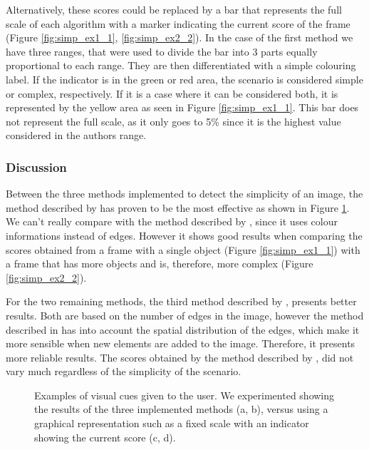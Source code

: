 Alternatively, these scores could be replaced by a bar that represents the full scale of each algorithm with a marker indicating the current score of the frame (Figure \ref{fig:simp_ex1_1}, \ref{fig:simp_ex2_2}).
In the case of the first method \cite{luo2008photo} we have three ranges, that were used to divide the bar into 3 parts equally proportional to each range. They are then differentiated with a simple colouring label. If the indicator is in the green or red area, the scenario is considered simple or complex, respectively. If it is a case where it can be considered both, it is represented by the yellow area as seen in Figure \ref{fig:simp_ex1_1}. This bar does not represent the full scale, as it only goes to 5\% since it is the highest value considered in the authors range.

\subsubsection{Discussion}
\label{subsub:simp_disc}

Between the three methods implemented to detect the simplicity of an image, the method described by \citeauthor{ke2006design} \cite{ke2006design} has proven to be the most effective as shown in Figure \ref{fig:simp_ex}. We can't really compare with the method described by \citeauthor{luo2008photo} \cite{luo2008photo}, since it uses colour informations instead of edges. However it shows good results when comparing the scores obtained from a frame with a single object (Figure \ref{fig:simp_ex1_1}) with a frame that has more objects and is, therefore, more complex (Figure \ref{fig:simp_ex2_2}).

For the two remaining methods, the third method described by \citeauthor{ke2006design} \cite{ke2006design}, presents better results. Both are based on the number of edges in the image, however the method described in \cite{ke2006design} has into account the spatial distribution of the edges, which make it more sensible when new elements are added to the image. Therefore, it presents more reliable results. The scores obtained by the method described by \citeauthor{kaoautomatic} \cite{kaoautomatic}, did not vary much regardless of the simplicity of the scenario.

\begin{figure}[htb]
	\centering
  	\caption{Examples of visual cues given to the user. We experimented showing the results of the three implemented methods (a, b), versus using a graphical representation such as a fixed scale with an indicator showing the current score (c, d).}
	\label{fig:simp_ex}
\end{figure}

